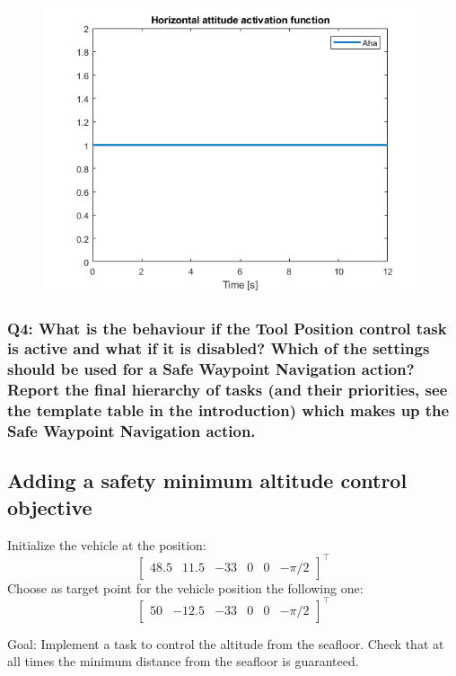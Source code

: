 \documentclass{article}
\begin{document}
\begin{figure}[H]
	\centering
	\includegraphics[width=0.7\linewidth]{images/Ex1/HorAtt_LowPrio_DifferentStartpos_DifferentEndpos_ActivFunct}
	\caption{}
	\label{fig:q3case3d}
\end{figure}


\subsubsection{Q4: What is the behaviour if the Tool Position control task is active and what if it is disabled? Which of the settings should be used for a Safe Waypoint Navigation action? Report the final hierarchy of tasks (and their priorities, see the template table in the introduction) which makes up the Safe Waypoint Navigation action.}


\subsection{Adding a safety minimum altitude control objective}
Initialize the vehicle at the position:
\begin{displaymath}
\begin{bmatrix} 48.5 & 11.5 & -33 & 0 & 0 &-\pi/2\end{bmatrix}^\top
\end{displaymath}
Choose as target point for the vehicle position the following one:
\begin{displaymath}
\begin{bmatrix} 50 & -12.5 & -33 & 0 & 0 & -\pi/2 \end{bmatrix}^\top
\end{displaymath}

Goal: Implement a task to control the altitude from the seafloor. Check that at all times the minimum distance from the seafloor is guaranteed.
\end{document}
